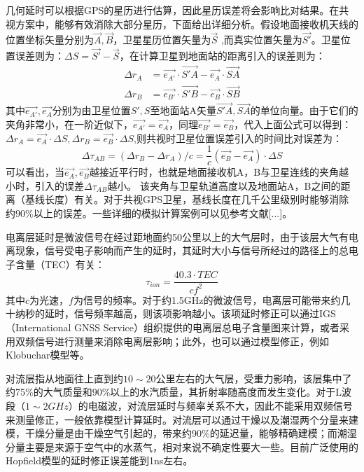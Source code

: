 几何延时可以根据GPS的星历进行估算，因此星历误差将会影响比对结果。在共视方案中，能够有效消除大部分星历，下面给出详细分析。假设地面接收机天线的位置坐标矢量分别为$\vec{A} ,\vec{B}$，卫星星历位置矢量为$\vec{S}$ ,而真实位置矢量为$\vec{S'}$。卫星位置误差则为：$\Delta S=\vec{S'}-\vec{S}$，在计算卫星到地面站的距离引入的误差则为：
\begin{subequations}
    \begin{align}
        \Delta r_{A}&=\vec{e_{A'}}\cdot \overrightarrow{S'A}-\vec{e_{A}}\cdot \overrightarrow{SA}\\
        \Delta r_{B}&=\vec{e_{B'}}\cdot \overrightarrow{S'B}-\vec{e_{B}}\cdot \overrightarrow{SB}
    \end{align}
\end{subequations}
其中$\vec{e_{A'}},\vec{e_{A}}$分别为由卫星位置$S',S$至地面站A矢量$\overrightarrow{S'A},\overrightarrow{SA}$的单位向量。由于它们的夹角非常小，在一阶近似下，$\vec{e_{A'}}=\vec{e_{A}}$，同理$\vec{e_{B'}}=\vec{e_{B}}$，代入上面公式可以得到：
$\Delta r_{A}=\vec{e_{A}} \cdot \Delta S,\Delta r_{B}=\vec{e_{B}} \cdot \Delta S$,则共视时卫星位置误差引入的时间比对误差为：
\begin{equation}
    \Delta \tau_{AB}=(\Delta r_{B}-\Delta r_{A})/c=\frac{1}{c}(\vec{e_{B}} -\vec{e_{A}} )\cdot \Delta S
\end{equation}
可以看出，当$\vec{e_{A}},\vec{e_{B}}$越接近平行时，也就是地面接收机A，B与卫星连线的夹角越小时，引入的误差$\Delta \tau_{AB}$越小。
该夹角与卫星轨道高度以及地面站A，B之间的距离（基线长度）有关。对于共视GPS卫星，基线长度在几千公里级别时能够消除约$90\%$以上的误差。一些详细的模拟计算案例可以见参考文献[...]。

电离层延时是微波信号在经过距地面约50公里以上的大气层时，由于该层大气有电离现象，信号受电子影响而产生的延时，其延时大小与信号所经过的路径上的总电子含量（TEC）有关：
\begin{equation}
\tau_{ion}=\dfrac{40.3\cdot TEC}{c f^{2}}
\end{equation}
其中$c$为光速，$f$为信号的频率。对于约1.5GHz的微波信号，电离层可能带来约几十纳秒的延时，信号频率越高，则该项影响越小。该项延时修正可以通过IGS（International GNSS Service）组织提供的电离层总电子含量图来计算，或者采用双频信号进行测量来消除电离层影响；此外，也可以通过模型修正，例如Klobuchar模型等。

对流层指从地面往上直到约$10\sim 20$公里左右的大气层，受重力影响，该层集中了约75\%的大气质量和90\%以上的水汽质量，其折射率随高度而发生变化。对于L波段（$1\sim2GHz$）的电磁波，对流层延时与频率关系不大，因此不能采用双频信号来测量修正，一般依靠模型计算延时。对流层可以通过干燥以及潮湿两个分量来建模，干燥分量是由干燥空气引起的，带来约90\%的延迟量，能够精确建模；而潮湿分量主要是来源于空气中的水蒸气，相对来说不确定性要大一些。目前广泛使用的Hopfield模型的延时修正误差能到1ns左右。

